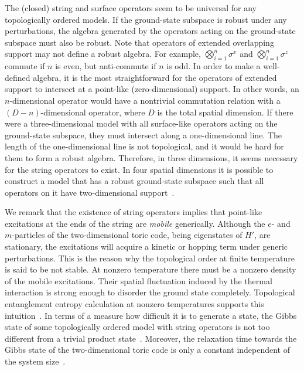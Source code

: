 The (closed) string and surface operators seem to be universal for any topologically ordered models. If the ground-state subspace is robust under any perturbations, the algebra generated by the operators acting on the ground-state subspace must also be robust. Note that operators of extended overlapping support may not define a robust algebra. 
For example, $\bigotimes_{i=1}^n \sigma^x$ and $\bigotimes_{i=1}^n \sigma^z $ commute if $n$ is even, but anti-commute if $n$ is odd.
In order to make a well-defined algebra, it is the most straightforward for the operators of extended support to intersect at a point-like (zero-dimensional) support. In other words, an $n$-dimensional operator would have a nontrivial commutation relation with a $(D-n)$-dimensional operator, where $D$ is the total spatial dimension. If there were a three-dimensional model with all surface-like operators acting on the ground-state subspace, they must intersect along a one-dimensional line. The length of the one-dimensional line is not topological, and it would be hard for them to form a robust algebra. 
Therefore, in three dimensions, it seems necessary for the string operators to exist.
In four spatial dimensions it is possible to construct a model that has a robust ground-state subspace such that all operators on it have two-dimensional support~\cite{DennisKitaevLandahlEtAl2002Topological}.


We remark that the existence of string operators implies that point-like excitations at the ends of the string are {\em mobile} generically. Although the $e$- and $m$-particles of the two-dimensional toric code, being eigenstates of $H'$, are stationary, the excitations will acquire a kinetic or hopping term under generic perturbations. This is the reason why the topological order at finite temperature is said to be not stable. At nonzero temperature there must be a nonzero density of the mobile excitations. Their spatial fluctuation induced by the thermal interaction is strong enough to disorder the ground state completely. Topological entanglement entropy calculation at nonzero temperatures supports this intuition~\cite{CastelnovoChamon2007Entanglement}. In terms of a measure how difficult it is to generate a state, the Gibbs state of some topologically ordered model with string operators is not too different from a trivial product state~\cite{Hastings2011warmTQO}. Moreover, the relaxation time towards the Gibbs state of the two-dimensional toric code is only a constant independent of the system size~\cite{AlickiFannesHorodecki2009thermalization}.



